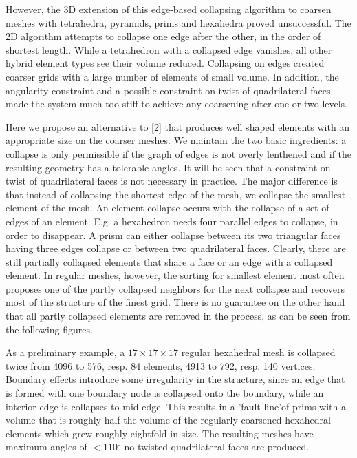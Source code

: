 \documentclass[11pt]{article}
\begin{document}
However, the 3D extension of this edge-based collapsing algorithm
to coarsen meshes with tetrahedra, pyramids, prims and hexahedra
proved unsuccessful. The 2D algorithm attempts to collapse one edge
after the other, in the order of shortest length. While a tetrahedron
with a collapsed edge vanishes, all other hybrid element types
see their volume reduced. Collapsing on edges created coarser grids
with a large number of elements of small volume. In addition, the angularity
constraint and a possible constraint on twist of quadrilateral faces
made the system much too stiff to achieve any coarsening after one or
two levels.

Here we propose an alternative to [2] that produces well shaped
elements with an appropriate size on the coarser meshes. We maintain
the two basic ingredients: a collapse is only permissible if the
graph of edges is not overly lenthened and if the resulting geometry
has a tolerable angles. It will be seen that a constraint on twist of
quadrilateral faces is not necessary in practice. The major difference
is that instead of collapsing the shortest edge of the mesh, we
collapse the smallest element of the mesh. An element collapse occurs
with the collapse of a set of edges of an element. E.g. a hexahedron
needs four parallel edges to collapse, in order to disappear. A prism
can either collapse between its two triangular faces having three
edges collapse or between two quadrilateral faces. Clearly, there are
still partially collapsed elements that share a face or an edge with
a collapsed element. In regular meshes, however, the sorting for
smallest element most often proposes one of the partly collapsed neighbors
for the next collapse and recovers most of the structure of the
finest grid. There is no guarantee on the other hand that all partly
collapsed elements are removed in the process, as can be seen from the
following figures.

As a preliminary example, a
$17\times17\times17$
regular hexahedral mesh is
collapsed twice from 4096 to 576, resp. 84 elements, 4913 to 792,
resp. 140 vertices.  Boundary effects introduce some irregularity in
the structure, since an edge that is formed with one boundary node is
collapsed onto the boundary, while an interior edge is collapses to
mid-edge. This results in a 'fault-line'of prims with a volume that is
roughly half the volume of the regularly coarsened hexahedral elements
which grew roughly eightfold in size.
The resulting meshes have maximum angles of $<110^{\circ}$
no twisted quadrilateral faces are produced.
\end{document}
